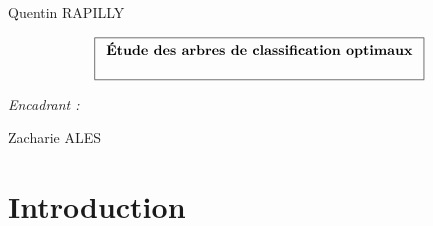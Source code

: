 \documentclass[12pt]{report}
\begin{document}
\pagestyle{fancyplain}
\renewcommand{\chaptermark}[1]{\markboth{\chaptername\ \thechapter. #1}{}}
\renewcommand{\sectionmark}[1]{\markright{\thesection. #1}}
\lhead[]{\fancyplain{}{\bfseries\leftmark}}
\rhead[]{\fancyplain{}{\bfseries\thepage}}
\cfoot{}

\makeatletter
\def\figurename{{\protect\sc \protect\small\bfseries Fig.}}
\def\f@ffrench{\protect\figurename\space{\protect\small\bf \thefigure}\space}
\let\fnum@figure\f@ffrench%
\let\captionORI\caption
\def\caption#1{\captionORI{\rm\small #1}}
\makeatother
\edef\hc{\string:}
\graphicspath{{img/}}

\thispagestyle{empty}
{\Large
\begin{center}
Quentin RAPILLY
\vskip1cm


$$\fbox{$
  \begin{array}{c}
  \textbf{Étude des arbres de classification optimaux}
  \vphantom{\int_\int}
  \end{array}
  $}
$$
\end{center}
\vskip8cm

\begin{flushright}
\textit{Encadrant :}

Zacharie ALES
\end{flushright}
}

\clearpage

\renewcommand{\baselinestretch}{1.30}\small \normalsize

\tableofcontents

\renewcommand{\baselinestretch}{1.18}\small \normalsize


\chapter{Introduction}
\end{document}
